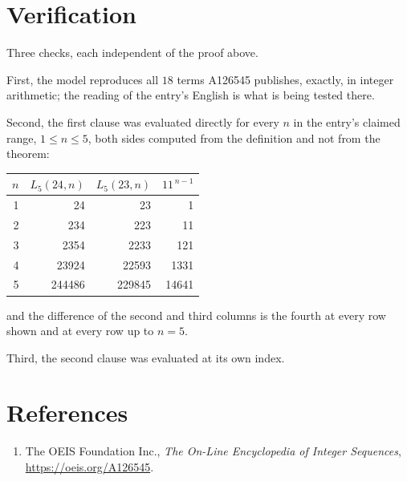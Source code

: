 \documentclass[11pt,a4paper]{article}
\theoremstyle{plain}
\theoremstyle{definition}
\begin{document}
\section{Verification}

Three checks, each independent of the proof above.

First, the model reproduces all $18$ terms A126545 publishes, exactly, in integer
arithmetic; the reading of the entry's English is what is being tested there.

Second, the first clause was evaluated directly for every $n$ in the entry's claimed range,
$1\le n\le5$, both sides computed from the definition and not from the theorem:

\begin{center}
\begin{tabular}{rrrr}
$n$ & $L_{5}(24,n)$ & $L_{5}(23,n)$ & $11^{\,n-1}$ \\ \hline
1 & 24 & 23 & 1 \\
2 & 234 & 223 & 11 \\
3 & 2354 & 2233 & 121 \\
4 & 23924 & 22593 & 1331 \\
5 & 244486 & 229845 & 14641 \\
\end{tabular}
\end{center}

\noindent and the difference of the second and third columns is the fourth at every row shown
and at every row up to $n=5$.

Third, the second clause was evaluated at its own index.

\section*{References}
\begin{enumerate}
\item The OEIS Foundation Inc., \emph{The On-Line Encyclopedia of Integer Sequences},
\url{https://oeis.org/A126545}.
\end{enumerate}
\end{document}
